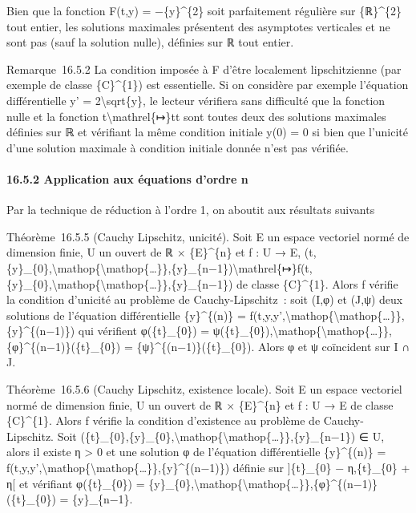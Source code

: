 \documentclass[]{article}
\begin{document}
Bien que la fonction F(t,y) = −\{y\}\^{}\{2\} soit parfaitement
régulière sur \{ℝ\}\^{}\{2\} tout entier, les solutions maximales
présentent des asymptotes verticales et ne sont pas (sauf la solution
nulle), définies sur ℝ tout entier.

Remarque~16.5.2 La condition imposée à F d'être localement
lipschitzienne (par exemple de classe \{C\}\^{}\{1\}) est essentielle.
Si on considère par exemple l'équation différentielle y' =
2\textbackslash{}sqrt\{\textbar{}y\textbar{}\}, le lecteur vérifiera
sans difficulté que la fonction nulle et la fonction
t\textbackslash{}mathrel\{↦\}t\textbar{}t\textbar{} sont toutes deux des
solutions maximales définies sur ℝ et vérifiant la même condition
initiale y(0) = 0 si bien que l'unicité d'une solution maximale à
condition initiale donnée n'est pas vérifiée.

\paragraph{16.5.2 Application aux équations d'ordre n}

Par la technique de réduction à l'ordre 1, on aboutit aux résultats
suivants

Théorème~16.5.5 (Cauchy Lipschitz, unicité). Soit E un espace vectoriel
normé de dimension finie, U un ouvert de ℝ × \{E\}\^{}\{n\} et f : U →
E,
(t,\{y\}\_\{0\},\textbackslash{}mathop\{\textbackslash{}mathop\{\ldots{}\}\},\{y\}\_\{n−1\})\textbackslash{}mathrel\{↦\}f(t,\{y\}\_\{0\},\textbackslash{}mathop\{\textbackslash{}mathop\{\ldots{}\}\},\{y\}\_\{n−1\})
de classe \{C\}\^{}\{1\}. Alors f vérifie la condition d'unicité au
problème de Cauchy-Lipschitz~: soit (I,φ) et (J,ψ) deux solutions de
l'équation différentielle \{y\}\^{}\{(n)\} =
f(t,y,y',\textbackslash{}mathop\{\textbackslash{}mathop\{\ldots{}\}\},\{y\}\^{}\{(n−1)\})
qui vérifient φ(\{t\}\_\{0\}) =
ψ(\{t\}\_\{0\}),\textbackslash{}mathop\{\textbackslash{}mathop\{\ldots{}\}\},\{φ\}\^{}\{(n−1)\}(\{t\}\_\{0\})
= \{ψ\}\^{}\{(n−1)\}(\{t\}\_\{0\}). Alors φ et ψ coïncident sur I ∩ J.

Théorème~16.5.6 (Cauchy Lipschitz, existence locale). Soit E un espace
vectoriel normé de dimension finie, U un ouvert de ℝ × \{E\}\^{}\{n\} et
f : U → E de classe \{C\}\^{}\{1\}. Alors f vérifie la condition
d'existence au problème de Cauchy-Lipschitz. Soit
(\{t\}\_\{0\},\{y\}\_\{0\},\textbackslash{}mathop\{\textbackslash{}mathop\{\ldots{}\}\},\{y\}\_\{n−1\})
∈ U, alors il existe η \textgreater{} 0 et une solution φ de l'équation
différentielle \{y\}\^{}\{(n)\} =
f(t,y,y',\textbackslash{}mathop\{\textbackslash{}mathop\{\ldots{}\}\},\{y\}\^{}\{(n−1)\})
définie sur {]}\{t\}\_\{0\} − η,\{t\}\_\{0\} + η{[} et vérifiant
φ(\{t\}\_\{0\}) =
\{y\}\_\{0\},\textbackslash{}mathop\{\textbackslash{}mathop\{\ldots{}\}\},\{φ\}\^{}\{(n−1)\}(\{t\}\_\{0\})
= \{y\}\_\{n−1\}.
\end{document}

